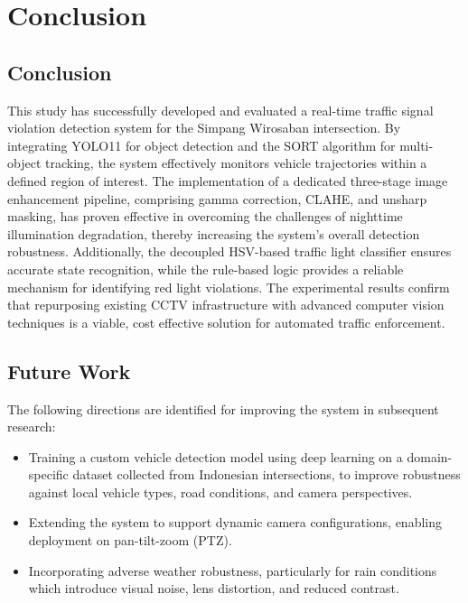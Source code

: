 \section{Conclusion}

\subsection{Conclusion}
This study has successfully developed and evaluated a real-time traffic signal violation detection system for the Simpang Wirosaban intersection. By integrating YOLO11 for object detection and the SORT algorithm for multi-object tracking, the system effectively monitors vehicle trajectories within a defined region of interest. The implementation of a dedicated three-stage image enhancement pipeline, comprising gamma correction, CLAHE, and unsharp masking, has proven effective in overcoming the challenges of nighttime illumination degradation, thereby increasing the system's overall detection robustness. Additionally, the decoupled HSV-based traffic light classifier ensures accurate state recognition, while the rule-based logic provides a reliable mechanism for identifying red light violations. The experimental results confirm that repurposing existing CCTV infrastructure with advanced computer vision techniques is a viable, cost effective solution for automated traffic enforcement.
\figViolationEx

\subsection{Future Work}
The following directions are identified for improving the system in subsequent research:
\begin{itemize}
    \item Training a custom vehicle detection model using deep learning on a domain-specific dataset collected from Indonesian intersections, to improve robustness against local vehicle types, road conditions, and camera perspectives. 
    \item Extending the system to support dynamic camera configurations, enabling deployment on pan-tilt-zoom (PTZ).
    \item Incorporating adverse weather robustness, particularly for rain conditions which introduce visual noise, lens distortion, and reduced contrast.
\end{itemize}